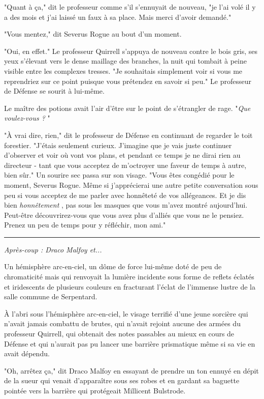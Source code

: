 "Quant à ça," dit le professeur comme s'il s'ennuyait de nouveau, "je l'ai volé il y a des mois et j'ai laissé un faux à sa place. Mais merci d'avoir demandé."

"Vous mentez," dit Severus Rogue au bout d'un moment.

"Oui, en effet." Le professeur Quirrell s'appuya de nouveau contre le bois gris, ses yeux s'élevant vers le dense maillage des branches, la nuit qui tombait à peine visible entre les complexes tresses. "Je souhaitais simplement voir si vous me reprendriez sur ce point puisque vous prétendez en savoir si peu." Le professeur de Défense se sourit à lui-même.

Le maître des potions avait l'air d'être sur le point de s'étrangler de rage. "\emph{Que voulez-vous ?} "

"À vrai dire, rien," dit le professeur de Défense en continuant de regarder le toit forestier. "J'étais seulement curieux. J'imagine que je vais juste continuer d'observer et voir où vont vos plans, et pendant ce temps je ne dirai rien au directeur - tant que vous acceptez de m'octroyer une faveur de temps à autre, bien sûr." Un sourire sec passa sur son visage. "Vous êtes congédié pour le moment, Severus Rogue. Même si j'apprécierai une autre petite conversation sous peu si vous acceptez de me parler avec honnêteté de vos allégeances. Et je dis bien \emph{honnêtement} , pas sous les masques que vous m'avez montré aujourd'hui. Peut-être découvrirez-vous que vous avez plus d'alliés que vous ne le pensiez. Prenez un peu de temps pour y réfléchir, mon ami."
\par\noindent\rule{\textwidth}{0.4pt}
\emph{Après-coup : Draco Malfoy et...} 

Un hémisphère arc-en-ciel, un dôme de force lui-même doté de peu de chromaticité mais qui renvoyait la lumière incidente sous forme de reflets éclatés et iridescents de plusieurs couleurs en fracturant l'éclat de l'immense lustre de la salle commune de Serpentard.

À l'abri sous l'hémisphère arc-en-ciel, le visage terrifié d'une jeune sorcière qui n'avait jamais combattu de brutes, qui n'avait rejoint aucune des armées du professeur Quirrell, qui obtenait des notes passables au mieux en cours de Défense et qui n'aurait pas pu lancer une barrière prismatique même si sa vie en avait dépendu.

"Oh, arrêtez ça," dit Draco Malfoy en essayant de prendre un ton ennuyé en dépit de la sueur qui venait d'apparaître sous ses robes et en gardant sa baguette pointée vers la barrière qui protégeait Millicent Bulstrode.

